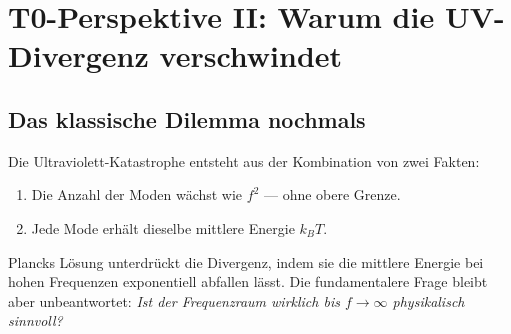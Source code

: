 \begin{table}[h]
    \centering
    \caption{Zwei Wege zur Gleichung $\epsilon = hf$}
    \label{tab:two_ways}
\end{table}

\clearpage

\section{T0-Perspektive II: Warum die UV-Divergenz verschwindet}
\label{sec:t0_uv}

\subsection{Das klassische Dilemma nochmals}

Die Ultraviolett-Katastrophe entsteht aus der Kombination von zwei Fakten:
\begin{enumerate}
    \item Die Anzahl der Moden wächst wie $f^2$ — ohne obere Grenze.
    \item Jede Mode erhält dieselbe mittlere Energie $k_BT$.
\end{enumerate}

Plancks Lösung unterdrückt die Divergenz, indem sie die mittlere Energie bei hohen 
Frequenzen exponentiell abfallen lässt. Die fundamentalere Frage bleibt aber 
unbeantwortet: \emph{Ist der Frequenzraum wirklich bis $f \to \infty$ physikalisch 
sinnvoll?}

